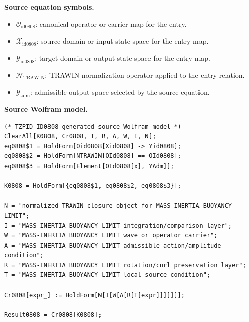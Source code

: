 \begin{minipage}[t]{0.49\linewidth}
\begingroup
\small
\raggedright
\textbf{Source equation symbols.}\par
\begin{itemize}[leftmargin=1.35em,itemsep=1pt,topsep=1pt,parsep=0pt]
    \item $\mathcal{O}_{\mathrm{id0808}}$: canonical operator or carrier map for the entry.
    \item $\mathcal{X}_{\mathrm{id0808}}$: source domain or input state space for the entry map.
    \item $\mathcal{Y}_{\mathrm{id0808}}$: target domain or output state space for the entry map.
    \item $\mathcal{N}_{\mathrm{TRAWIN}}$: TRAWIN normalization operator applied to the entry relation.
    \item $\mathcal{Y}_{\mathrm{adm}}$: admissible output space selected by the source equation.
\end{itemize}
\endgroup
\end{minipage}\hfill
\begin{minipage}[t]{0.47\linewidth}
\begingroup
\scriptsize
\raggedright
\textbf{Source Wolfram model.}\par
\begin{Verbatim}[fontsize=\tiny,breaklines=true,breakanywhere=true]
(* TZPID ID0808 generated source Wolfram model *)
ClearAll[K0808, Cr0808, T, R, A, W, I, N];
eq0808$1 = HoldForm[Oid0808[Xid0808] -> Yid0808];
eq0808$2 = HoldForm[NTRAWIN[OId0808] == OId0808];
eq0808$3 = HoldForm[Element[OId0808[x], YAdm]];

K0808 = HoldForm[{eq0808$1, eq0808$2, eq0808$3}];

N = "normalized TRAWIN closure object for MASS-INERTIA BUOYANCY LIMIT";
I = "MASS-INERTIA BUOYANCY LIMIT integration/comparison layer";
W = "MASS-INERTIA BUOYANCY LIMIT wave or operator carrier";
A = "MASS-INERTIA BUOYANCY LIMIT admissible action/amplitude condition";
R = "MASS-INERTIA BUOYANCY LIMIT rotation/curl preservation layer";
T = "MASS-INERTIA BUOYANCY LIMIT local source condition";

Cr0808[expr_] := HoldForm[N[I[W[A[R[T[expr]]]]]]];

Result0808 = Cr0808[K0808];
\end{Verbatim}
\endgroup
\end{minipage}

